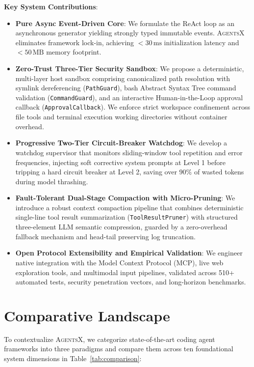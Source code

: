 \documentclass[10pt,twocolumn,letterpaper]{article}
\begin{document}
\noindent\textbf{Key System Contributions}:
\begin{itemize}
    \item \textbf{Pure Async Event-Driven Core}: We formulate the ReAct loop as an asynchronous generator yielding strongly typed immutable events. \textsc{AgentsX} eliminates framework lock-in, achieving $<30\,\text{ms}$ initialization latency and $<50\,\text{MB}$ memory footprint.
    \item \textbf{Zero-Trust Three-Tier Security Sandbox}: We propose a deterministic, multi-layer host sandbox comprising canonicalized path resolution with symlink dereferencing (\texttt{PathGuard}), bash Abstract Syntax Tree command validation (\texttt{CommandGuard}), and an interactive Human-in-the-Loop approval callback (\texttt{ApprovalCallback}). We enforce strict workspace confinement across file tools and terminal execution working directories without container overhead.
    \item \textbf{Progressive Two-Tier Circuit-Breaker Watchdog}: We develop a watchdog supervisor that monitors sliding-window tool repetition and error frequencies, injecting soft corrective system prompts at Level 1 before tripping a hard circuit breaker at Level 2, saving over $90\%$ of wasted tokens during model thrashing.
    \item \textbf{Fault-Tolerant Dual-Stage Compaction with Micro-Pruning}: We introduce a robust context compaction pipeline that combines deterministic single-line tool result summarization (\texttt{ToolResultPruner}) with structured three-element LLM semantic compression, guarded by a zero-overhead fallback mechanism and head-tail preserving log truncation.
    \item \textbf{Open Protocol Extensibility and Empirical Validation}: We engineer native integration with the Model Context Protocol (MCP), live web exploration tools, and multimodal input pipelines, validated across 510+ automated tests, security penetration vectors, and long-horizon benchmarks.
\end{itemize}

\section{Comparative Landscape}
\label{sec:related}

To contextualize \textsc{AgentsX}, we categorize state-of-the-art coding agent frameworks into three paradigms and compare them across ten foundational system dimensions in Table~\ref{tab:comparison}:
\end{document}
